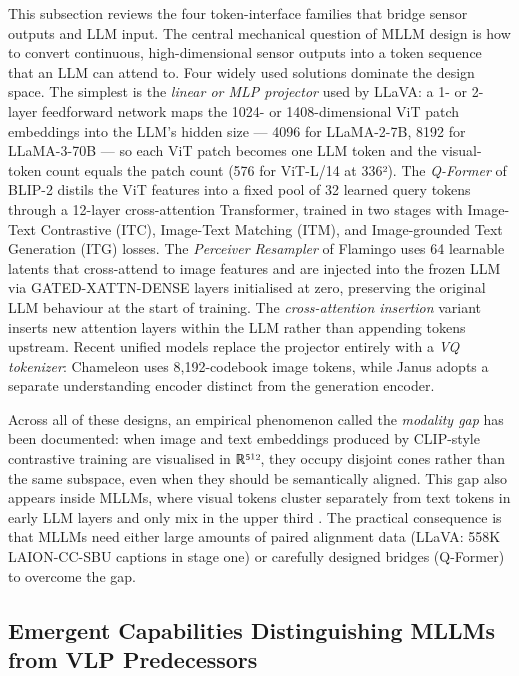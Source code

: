 \documentclass{article}
\begin{document}
This subsection reviews the four token-interface families that bridge sensor outputs and LLM input. The central mechanical question of MLLM design is how to convert continuous, high-dimensional sensor outputs into a token sequence that an LLM can attend to. Four widely used solutions dominate the design space. The simplest is the \emph{linear or MLP projector} used by LLaVA: a 1- or 2-layer feedforward network maps the 1024- or 1408-dimensional ViT patch embeddings into the LLM's hidden size --- 4096 for LLaMA-2-7B, 8192 for LLaMA-3-70B --- so each ViT patch becomes one LLM token and the visual-token count equals the patch count (576 for ViT-L/14 at 336²). The \emph{Q-Former} of BLIP-2 \citep{li2023blip2bootstrapping} distils the ViT features into a fixed pool of 32 learned query tokens through a 12-layer cross-attention Transformer, trained in two stages with Image-Text Contrastive (ITC), Image-Text Matching (ITM), and Image-grounded Text Generation (ITG) losses. The \emph{Perceiver Resampler} of Flamingo \citep{alayrac20222022} uses 64 learnable latents that cross-attend to image features and are injected into the frozen LLM via GATED-XATTN-DENSE layers initialised at zero, preserving the original LLM behaviour at the start of training. The \emph{cross-attention insertion} variant inserts new attention layers within the LLM rather than appending tokens upstream. Recent unified models replace the projector entirely with a \emph{VQ tokenizer}: Chameleon uses 8,192-codebook image tokens, while Janus adopts a separate understanding encoder distinct from the generation encoder.

Across all of these designs, an empirical phenomenon called the \emph{modality gap} has been documented: when image and text embeddings produced by CLIP-style contrastive training are visualised in ℝ⁵¹², they occupy disjoint cones rather than the same subspace, even when they should be semantically aligned. This gap also appears inside MLLMs, where visual tokens cluster separately from text tokens in early LLM layers and only mix in the upper third \citep{bordes20242024}. The practical consequence is that MLLMs need either large amounts of paired alignment data (LLaVA: 558K LAION-CC-SBU captions in stage one) or carefully designed bridges (Q-Former) to overcome the gap.

\subsection{Emergent Capabilities Distinguishing MLLMs from VLP Predecessors}\label{emergent-capabilities-distinguishing-mllms-from-vlp-predecessors}
\end{document}
